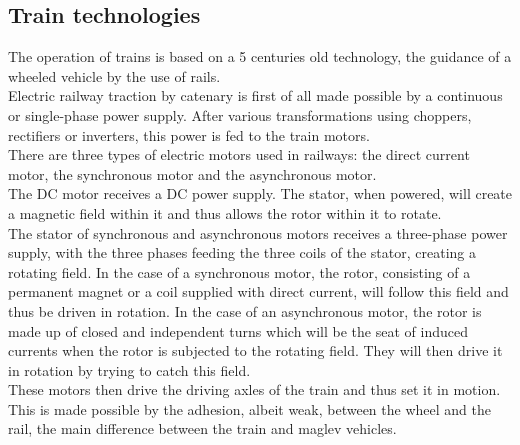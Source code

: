 \documentclass[12pt, a4paper, onecolumn]{article}
\renewcommand{\tab}{\tabto{15px}}
\begin{document}
\subsection{Train technologies}
\tab The operation of trains is based on a 5 centuries old technology, the guidance of a wheeled vehicle by the use of rails. \\
\tab Electric railway traction by catenary is first of all made possible by a continuous or single-phase power supply.
After various transformations using choppers, rectifiers or inverters, this power is fed to the train motors. \\
\linebreak
\tab There are three types of electric motors used in railways: the direct current motor, the synchronous motor and the asynchronous motor. \\
\tab The DC motor receives a DC power supply.
The stator, when powered, will create a magnetic field within it and thus allows the rotor within it to rotate. \\
\tab  The stator of synchronous and asynchronous motors receives a three-phase power supply, with the three phases feeding the three coils of the stator, creating a rotating field.
In the case of a synchronous motor, the rotor, consisting of a permanent magnet or a coil supplied with direct current, will follow this field and thus be driven in rotation.
In the case of an asynchronous motor, the rotor is made up of closed and independent turns which will be the seat of induced currents when the rotor is subjected to the rotating field.
They will then drive it in rotation by trying to catch this field. \\
\tab These motors then drive the driving axles of the train and thus set it in motion.
This is made possible by the adhesion, albeit weak, between the wheel and the rail, the main difference between the train and maglev vehicles.
\end{document}
